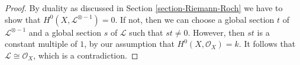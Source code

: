 \documentclass[10pt,a4paper]{amsart}
\theoremstyle{plain}
\theoremstyle{definition}
\theoremstyle{remark}
\numberwithin{equation}{subsection}
\begin{document}
\begin{proof}
By duality as discussed in Section \ref{section-Riemann-Roch} we have to
show that $H^0(X, \mathcal{L}^{\otimes - 1}) = 0$. If not, then we can
choose a global section $t$ of $\mathcal{L}^{\otimes - 1}$
and a global section $s$ of $\mathcal{L}$ such that $st \not = 0$.
However, then $st$ is a constant multiple of $1$, by our assumption
that $H^0(X, \mathcal{O}_X) = k$. It follows that
$\mathcal{L} \cong \mathcal{O}_X$, which is a contradiction.
\end{proof}
\end{document}
